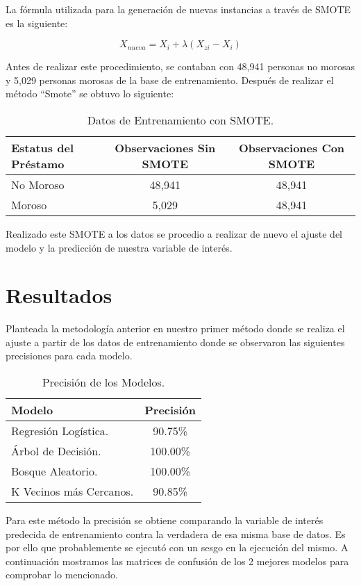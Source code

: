 \documentclass[a4paper,12pt]{article}
\begin{document}
La fórmula utilizada para la generación de nuevas instancias a través de SMOTE es la siguiente:

$$ X_{nueva} = X_i + \lambda (X_{zi} - X_i)$$

Antes de realizar este procedimiento, se contaban con 48,941 personas no morosas y 5,029 personas morosas de la base de entrenamiento. Después de realizar el método ``Smote'' se obtuvo lo siguiente:

\begin{table}[h]
    \centering
    \caption{Datos de Entrenamiento con SMOTE.}
    \begin{tabular}{lcc}
    \hline
Estatus del Préstamo	&	Observaciones Sin SMOTE & Observaciones Con SMOTE	\\
\hline
No Moroso	&	48,941 & 48,941\\
Moroso	&	5,029 & 48,941\\
    \hline
    \end{tabular}
    \label{tab:3}
\end{table}

Realizado este SMOTE a los datos se procedio a realizar de nuevo el ajuste del modelo y la predicción de nuestra variable de interés.

\section{Resultados}

Planteada la metodología anterior en nuestro primer método donde se realiza el ajuste a partir de los datos de entrenamiento donde se observaron las siguientes precisiones para cada modelo.

\begin{table}[h]
    \centering
    \caption{Precisión de los Modelos.}
    \begin{tabular}{lc}
    \hline
Modelo	&	Precisión	\\
\hline
Regresión Logística.	&	90.75\%	\\
Árbol de Decisión.	&	100.00\%	\\
Bosque Aleatorio.	&	100.00\%	\\
K Vecinos más Cercanos.	&	90.85\%	\\
    \hline
    \end{tabular}
    \label{tab:4}
\end{table}

Para este método la precisión se obtiene comparando la variable de interés predecida de entrenamiento contra la verdadera de esa misma base de datos. Es por ello que probablemente se ejecutó con un sesgo en la ejecución del mismo. A continuación mostramos las matrices de confusión de los 2 mejores modelos para comprobar lo mencionado.
\end{document}
